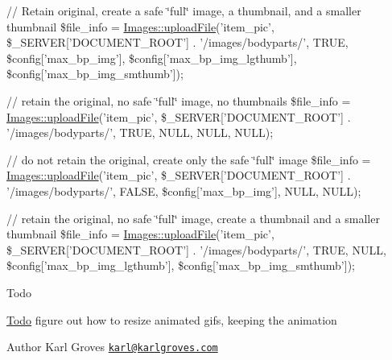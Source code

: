 // Retain original, create a safe \char`\"{}full\char`\"{} image, a thumbnail, and a smaller thumbnail \$file\-\_\-info = \hyperlink{class_images_a9816037394561e5a162c8162168b20d9}{Images\-::upload\-File}('item\-\_\-pic', \$\-\_\-\-S\-E\-R\-V\-E\-R\mbox{[}'D\-O\-C\-U\-M\-E\-N\-T\-\_\-\-R\-O\-O\-T'\mbox{]} . '/images/bodyparts/', T\-R\-U\-E, \$config\mbox{[}'max\-\_\-bp\-\_\-img'\mbox{]}, \$config\mbox{[}'max\-\_\-bp\-\_\-img\-\_\-lgthumb'\mbox{]}, \$config\mbox{[}'max\-\_\-bp\-\_\-img\-\_\-smthumb'\mbox{]});

// retain the original, no safe \char`\"{}full\char`\"{} image, no thumbnails \$file\-\_\-info = \hyperlink{class_images_a9816037394561e5a162c8162168b20d9}{Images\-::upload\-File}('item\-\_\-pic', \$\-\_\-\-S\-E\-R\-V\-E\-R\mbox{[}'D\-O\-C\-U\-M\-E\-N\-T\-\_\-\-R\-O\-O\-T'\mbox{]} . '/images/bodyparts/', T\-R\-U\-E, N\-U\-L\-L, N\-U\-L\-L, N\-U\-L\-L);

// do not retain the original, create only the safe \char`\"{}full\char`\"{} image \$file\-\_\-info = \hyperlink{class_images_a9816037394561e5a162c8162168b20d9}{Images\-::upload\-File}('item\-\_\-pic', \$\-\_\-\-S\-E\-R\-V\-E\-R\mbox{[}'D\-O\-C\-U\-M\-E\-N\-T\-\_\-\-R\-O\-O\-T'\mbox{]} . '/images/bodyparts/', F\-A\-L\-S\-E, \$config\mbox{[}'max\-\_\-bp\-\_\-img'\mbox{]}, N\-U\-L\-L, N\-U\-L\-L);

// retain the original, no safe \char`\"{}full\char`\"{} image, create a thumbnail and a smaller thumbnail \$file\-\_\-info = \hyperlink{class_images_a9816037394561e5a162c8162168b20d9}{Images\-::upload\-File}('item\-\_\-pic', \$\-\_\-\-S\-E\-R\-V\-E\-R\mbox{[}'D\-O\-C\-U\-M\-E\-N\-T\-\_\-\-R\-O\-O\-T'\mbox{]} . '/images/bodyparts/', T\-R\-U\-E, N\-U\-L\-L, \$config\mbox{[}'max\-\_\-bp\-\_\-img\-\_\-lgthumb'\mbox{]}, \$config\mbox{[}'max\-\_\-bp\-\_\-img\-\_\-smthumb'\mbox{]});

\begin{DoxyRefDesc}{Todo}
\item[\hyperlink{todo__todo000012}{Todo}]figure out how to resize animated gifs, keeping the animation \end{DoxyRefDesc}
\begin{DoxyAuthor}{Author}
Karl Groves \href{mailto:karl@karlgroves.com}{\tt karl@karlgroves.\-com} 
\end{DoxyAuthor}


